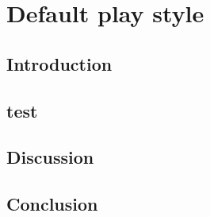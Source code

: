 \section{Default play style}

\subsection{Introduction}

\subsection{test}


\subsection{Discussion}

\subsection{Conclusion}
